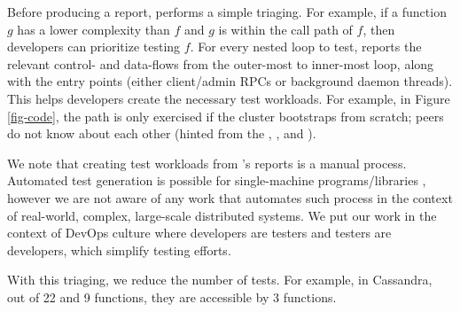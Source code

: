 %
%

%
Before producing a report, \sfind performs a simple triaging.  For
example, if a function $g$ has a lower complexity than $f$ and $g$ is
within the call path of $f$, then developers can prioritize testing $f$.
%
For every nested loop to test, \sfind reports the relevant control- and
data-flows from the outer-most to inner-most loop, along with the entry
points (either client/admin RPCs or background daemon threads).
%
This helps developers create the necessary test workloads.  For example,
in Figure \ref{fig-code}, the \oonnn path is only exercised if the cluster
bootstraps from scratch; peers do not know about each other (hinted from
the , ,  and
).

We note that creating test workloads from \sfind's reports is a manual
process.  Automated test generation is possible for single-machine
programs/libraries \cite{Cadar+08-KLEE}, however we are not aware of any
work that automates such process in the context of real-world, complex,
large-scale distributed systems.
%
We put our work in the context of DevOps culture
\cite{Limoncelli+11-Devops} where developers are testers and testers are
developers, which simplify testing efforts.



With this triaging, we reduce the
number of tests.  For example, in Cassandra, out of 22 \oonn and 9 \oonnn
functions, they are accessible by 3 \oonnn functions.
\fi



